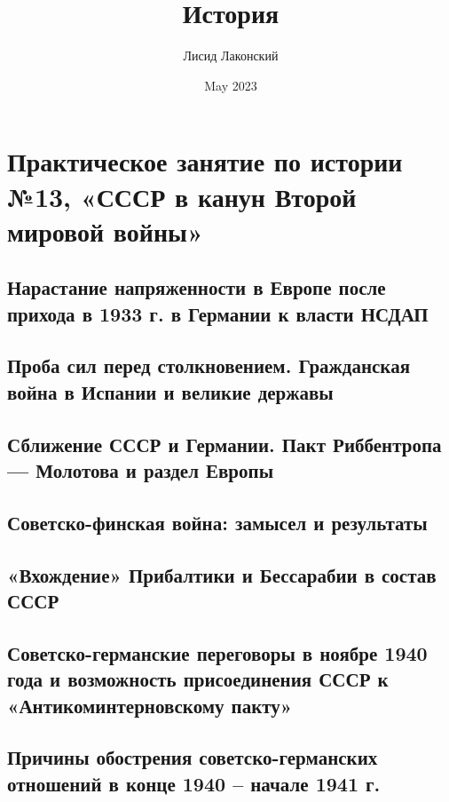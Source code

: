 \documentclass{article}
\title{История}
\author{Лисид Лаконский}
\date{May 2023}
\begin{document}
\raggedright

\maketitle
\tableofcontents
\pagebreak

\section{Практическое занятие по истории №13, «СССР в канун Второй мировой войны»}

\subsection{Нарастание напряженности в Европе после прихода в 1933 г. в Германии к власти НСДАП}

\pagebreak
\subsection{Проба сил перед столкновением. Гражданская война в Испании и великие державы}

\pagebreak
\subsection{Сближение СССР и Германии. Пакт Риббентропа — Молотова и раздел Европы}

\pagebreak
\subsection{Советско-финская война: замысел и результаты}

\pagebreak
\subsection{«Вхождение» Прибалтики и Бессарабии в состав СССР}

\pagebreak
\subsection{Советско-германские переговоры в ноябре 1940 года и возможность присоединения СССР к «Антикоминтерновскому пакту»}

\pagebreak
\subsection{Причины обострения советско-германских отношений в конце 1940 – начале 1941 г.}
\end{document}
